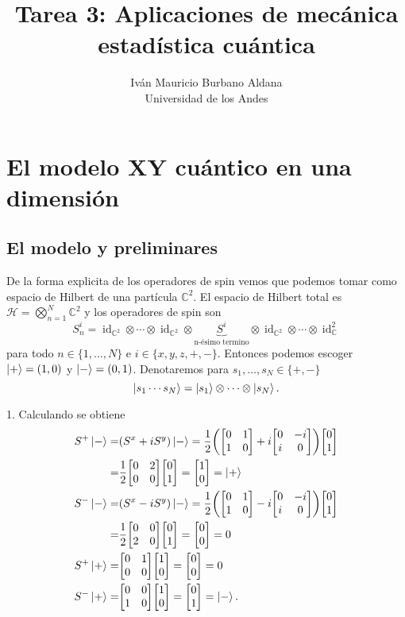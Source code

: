 \documentclass{article}
\title{Tarea 3: Aplicaciones de mecánica estadística cuántica}
\author{Iván Mauricio Burbano Aldana\\Universidad de los Andes}
\DeclareMathOperator{\id}{id}
\begin{document}
\maketitle

\section{El modelo XY cuántico en una dimensión}

\subsection{El modelo y preliminares}

De la forma explicita de los operadores de spin vemos que podemos tomar como espacio de Hilbert de una partícula $\mathbb{C}^2$. El espacio de Hilbert total es $\mathcal{H}=\bigotimes\limits_{n=1}^N\mathbb{C}^2$ y los operadores de spin son
\begin{equation}
S_n^{i}=\id_{\mathbb{C}^2}\otimes\cdots\otimes\id_{\mathbb{C}^2}\otimes\underbrace{S^i}_{\text{n-ésimo termino}}\otimes\id_{\mathbb{C}^2}\otimes\cdots\otimes\id_\mathbb{C}^2
\end{equation}
para todo $n\in\{1,\dots,N\}$ e $i\in\{x,y,z,+,-\}$. Entonces podemos escoger $\ket{+}=(1,0)$ y $\ket{-}=(0,1)$. Denotaremos para $s_1,\dots,s_N\in\{+,-\}$
\begin{equation}
\ket{s_1\cdots s_N}=\ket{s_1}\otimes\cdots\otimes\ket{s_N}.
\end{equation}

1. Calculando se obtiene
\begin{align}
\begin{split}
S^+\ket{-}=&(S^x+iS^y)\ket{-}=\frac{1}{2}\qty(\mqty[0 & 1 \\ 1 & 0]+i\mqty[0 & -i \\ i & 0])\mqty[0 \\ 1]\\
=&\frac{1}{2}\mqty[0 & 2 \\ 0 & 0]\mqty[0 \\ 1]=\mqty[1\\0]=\ket{+}\\
S^-\ket{-}=&(S^x-iS^y)\ket{-}=\frac{1}{2}\qty(\mqty[0 & 1 \\ 1 & 0]-i\mqty[0 & -i \\ i & 0])\mqty[0 \\ 1]\\
=&\frac{1}{2}\mqty[0 & 0 \\ 2 & 0]\mqty[0 \\ 1]=\mqty[0\\0]=0\\
S^+\ket{+}=&\mqty[0 & 1 \\ 0 & 0]\mqty[1 \\ 0]=\mqty[0\\0]=0\\
S^-\ket{+}=&\mqty[0 & 0 \\ 1 & 0]\mqty[1 \\ 0]=\mqty[0\\1]=\ket{-}.
\end{split}
\end{align}
\end{document}
